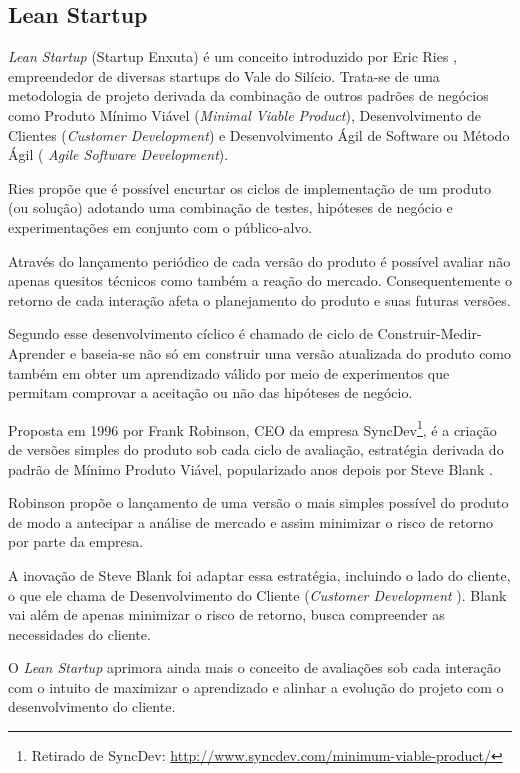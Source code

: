 \subsection{Lean Startup}
\par \emph{Lean Startup} (Startup Enxuta) é um conceito introduzido por Eric Ries  \citep{ries:11}, empreendedor de diversas startups do Vale do Silício. Trata-se de uma metodologia de projeto derivada da combinação de outros padrões de negócios como Produto Mínimo Viável (\emph{Minimal Viable Product}), Desenvolvimento de Clientes (\emph{Customer Development}) e Desenvolvimento Ágil de Software ou Método Ágil ( \emph{Agile Software Development}).
\par Ries propõe que é possível encurtar os ciclos de implementação de um produto (ou solução) adotando uma combinação de testes, hipóteses de negócio e experimentações em conjunto com o público-alvo. 
\par Através do lançamento periódico de cada versão do produto é possível avaliar não apenas quesitos técnicos como também a reação do mercado. Consequentemente o retorno de cada interação afeta o planejamento do produto e suas futuras versões.
\par Segundo \cite{ries:11} esse desenvolvimento cíclico é chamado de ciclo de Construir-Medir-Aprender e baseia-se não só em construir uma versão atualizada do produto como também em obter um aprendizado válido por meio de experimentos que permitam comprovar a aceitação ou não das hipóteses de negócio.
\par Proposta em 1996 por Frank Robinson, CEO da empresa SyncDev\footnote{ Retirado de SyncDev: \url{http://www.syncdev.com/minimum-viable-product/}}, é a criação de versões simples do produto sob cada ciclo de avaliação, estratégia derivada do padrão de Mínimo Produto Viável, popularizado anos depois por Steve Blank \citep{junk:2000}.
\par Robinson propõe o lançamento de uma versão o mais simples possível do produto de modo a antecipar a análise de mercado e assim minimizar o risco de retorno por parte da empresa.
\par A inovação de Steve Blank foi adaptar essa estratégia, incluindo o lado do cliente, o que ele chama de Desenvolvimento do Cliente (\emph{Customer Development} ). Blank vai além de apenas minimizar o risco de retorno, busca compreender as necessidades do cliente.
\par O \emph{Lean Startup} aprimora ainda mais o conceito de avaliações sob cada interação com o intuito de maximizar o aprendizado e alinhar a evolução do projeto com o desenvolvimento do cliente.

